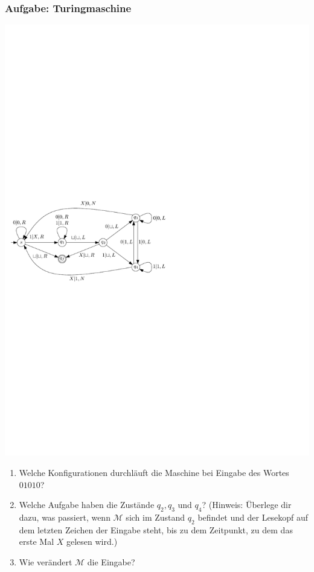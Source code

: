\begin{frame}
\frametitle{Aufgabe: Turingmaschine}
\vspace{-1cm}
\begin{center}
     \includegraphics[scale=0.7]{images/Uebungsblatt_2_A5}
   \end{center}
   
\begin{enumerate}
 \item Welche Konfigurationen durchläuft die Maschine bei Eingabe des
  Wortes $01010$?

 \item Welche Aufgabe haben die Zustände $q_2, q_3$ und $q_4$? 
       (Hinweis: Überlege dir dazu, was passiert, wenn $\mathcal{M}$ sich im Zustand $q_2$ befindet und der Lesekopf auf dem letzten Zeichen der Eingabe steht, bis zu dem Zeitpunkt, zu dem das erste Mal $X$ gelesen wird.)  

 \item Wie verändert $\mathcal{M}$ die Eingabe?

\end{enumerate}
\end{frame}

